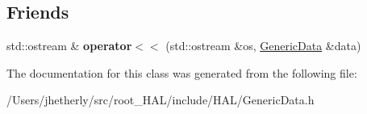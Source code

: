 \subsection*{Friends}
\begin{DoxyCompactItemize}
\item 
\hypertarget{class_h_a_l_1_1_generic_data_ad3342706941e18f58dc3a39a63ccfd7c}{std\+::ostream \& {\bfseries operator$<$$<$} (std\+::ostream \&os, \hyperlink{class_h_a_l_1_1_generic_data}{Generic\+Data} \&data)}\label{class_h_a_l_1_1_generic_data_ad3342706941e18f58dc3a39a63ccfd7c}

\end{DoxyCompactItemize}


The documentation for this class was generated from the following file\+:\begin{DoxyCompactItemize}
\item 
/\+Users/jhetherly/src/root\+\_\+\+H\+A\+L/include/\+H\+A\+L/Generic\+Data.\+h\end{DoxyCompactItemize}
